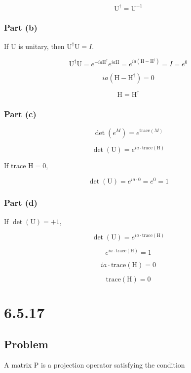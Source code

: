 \documentclass[12pt]{article}
\begin{document}
\[
    \mathrm{U}^\dagger = \mathrm{U}^{-1}
\]

\subsubsection{Part (b)}

If \(\mathrm{U}\) is unitary, then \(\mathrm{U}^\dagger \mathrm{U} = I\).

\[
    \mathrm{U}^\dagger \mathrm{U} = e^{-i a \mathrm{H^\dagger}} e^{i a \mathrm{H}} = e^{i a \left(\mathrm{H}-\mathrm{H^\dagger}\right)} = I = e^0
\]

\[
    i a \left(\mathrm{H}-\mathrm{H^\dagger}\right) = 0
\]

\[
    \mathrm{H} = \mathrm{H}^\dagger
\]

\subsubsection{Part (c)}

\[
    \det(e^M) = e^{\text{trace}(M)}
\]

\[
    \det(\mathrm{U}) = e^{i a\cdot\text{trace}(\mathrm{H})}
\]

If trace \(\mathrm{H}=0\),

\[
    \det(\mathrm{U}) = e^{i a \cdot 0} = e^0 = 1
\]

\subsubsection{Part (d)}

If \(\det(\mathrm{U}) = +1\),

\[
    \det(\mathrm{U}) = e^{i a\cdot\text{trace}(\mathrm{H})}
\]

\[
    e^{i a\cdot\text{trace}(\mathrm{H})} = 1
\]

\[
    i a\cdot\text{trace}(\mathrm{H}) = 0
\]

\[
    \text{trace}(\mathrm{H}) = 0
\]

\newpage
\section{6.5.17}

\subsection{Problem}

A matrix \(\mathrm{P}\) is a projection operator satisfying the condition
\end{document}
